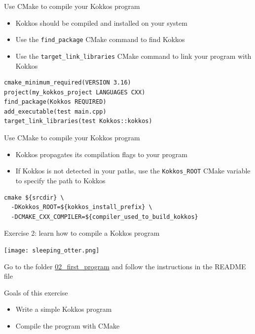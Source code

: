 \documentclass[aspectratio=169]{beamer}
\begin{document}
\begin{frame}[fragile]{Use CMake to compile your Kokkos program}
    \begin{itemize}
        \item Kokkos should be compiled and installed on your system
        \item Use the \texttt{find\_package} CMake command to find Kokkos
        \item Use the \texttt{target\_link\_libraries} CMake command to link your program with Kokkos
    \end{itemize}
    \begin{verbatim}
cmake_minimum_required(VERSION 3.16)
project(my_kokkos_project LANGUAGES CXX)
find_package(Kokkos REQUIRED)
add_executable(test main.cpp)
target_link_libraries(test Kokkos::kokkos)
    \end{verbatim}
\end{frame}


\begin{frame}[fragile]{Use CMake to compile your Kokkos program}
    \begin{itemize}
        \item Kokkos propagates its compilation flags to your program
        \item If Kokkos is not detected in your paths, use the \texttt{Kokkos\_ROOT} CMake variable to specify the path to Kokkos
    \end{itemize}
    \begin{verbatim}
cmake ${srcdir} \
  -DKokkos_ROOT=${kokkos_install_prefix} \
  -DCMAKE_CXX_COMPILER=${compiler_used_to_build_kokkos}
    \end{verbatim}
\end{frame}


\begin{frame}[fragile]{Exercise 2: learn how to compile a Kokkos program}
    \begin{center}
        \texttt{[image: sleeping\_otter.png]}
    \end{center}

    Go to the folder \href{https://github.com/CExA-project/cexa-kokkos-tutorials/tree/main/exercises/02_first_program}{02\_first\_program} and follow the instructions in the README file

    \begin{block}{Goals of this exercise}
        \begin{itemize}
            \item Write a simple Kokkos program
            \item Compile the program with CMake
        \end{itemize}
    \end{block}
\end{frame}
\end{document}
